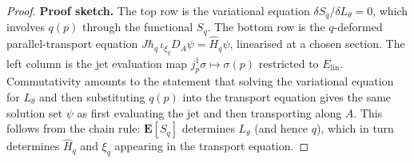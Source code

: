 \begin{proof}
\textbf{Proof sketch.}
The top row is the variational equation $\delta S_q / \delta L_\theta = 0$,
which involves $q(p)$ through the functional $S_q$.  The bottom row is the
$q$-deformed parallel-transport equation
$J\hbar_q\,\iota_{\xi_q}D_A\psi = \hat{H}_q\psi$,
linearised at a chosen section.
The left column is the jet evaluation map
$j^1_p \sigma \mapsto \sigma(p)$ restricted to $E_{\mathrm{lin}}$.
Commutativity amounts to the statement that solving the variational
equation for $L_\theta$ and then substituting $q(p)$ into the transport
equation gives the same solution set $\psi$ as first evaluating the jet
and then transporting along $A$.  This follows from the chain rule:
$\mathbf{E}[S_q]$ determines $L_\theta$ (and hence $q$), which in turn
determines $\hat{H}_q$ and $\xi_q$ appearing in the transport equation.
\end{proof}
